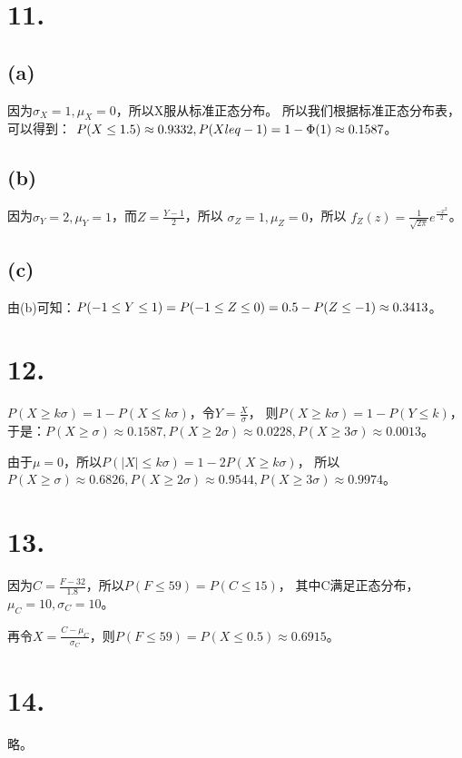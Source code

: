 \documentclass[UTF8]{report}
\begin{document}
    \section*{11.}
        \subsection*{(a)}
            因为$\sigma_X = 1, \mu_X = 0$，所以X服从标准正态分布。
            所以我们根据标准正态分布表，可以得到：
            $P(X \leq 1.5) \approx 0.9332,\\
             P(X leq -1) = 1 - \Phi(1) \approx 0.1587$。
        \subsection*{(b)}
            因为$\sigma_Y = 2, \mu_Y = 1$，而$Z = \frac{Y - 1}{2}$，所以
            $\sigma_Z = 1, \mu_Z = 0$，所以
            $f_Z(z) = \frac{1}{\sqrt{2\pi}}e^{\frac{-x^2}{2}}$。
        \subsection*{(c)}
            由(b)可知：$P(-1 \leq Y \leq 1) = P(-1 \leq Z \leq 0) =\\ 0.5 - P(Z \leq -1) \approx 0.3413$。
    \section*{12.}
        $P(X \geq k\sigma) = 1 - P(X \leq k\sigma)$，令$Y = \frac{X}{\sigma}$，
        则$P(X \geq k\sigma) = 1 - P(Y \leq k)$，于是：$P(X \geq \sigma) \approx 0.1587,
        P(X \geq 2\sigma) \approx 0.0228, P(X \geq 3\sigma) \approx 0.0013$。

        由于$\mu = 0$，所以$P(|X| \leq k\sigma) = 1 - 2P(X \geq k\sigma)$，
        所以$P(X \geq \sigma) \approx 0.6826,
        P(X \geq 2\sigma) \approx 0.9544, P(X \geq 3\sigma) \approx 0.9974$。
    \section*{13.}
        因为$C = \frac{F - 32}{1.8}$，所以$P(F \leq 59) = P(C \leq 15)$，
        其中C满足正态分布，$\mu_C = 10, \sigma_C = 10$。
        
        再令$X = \frac{C - \mu_C}{\sigma_C}$，则$P(F \leq 59) = P(X \leq 0.5) \approx 0.6915$。
    \section*{14.}
        略。
\end{document}

